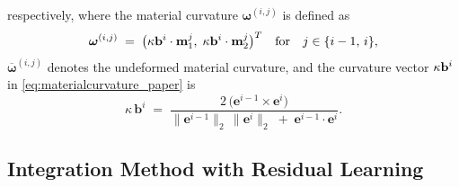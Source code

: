\begin{thm}
respectively, where the material curvature $\bm{\omega}^{(i,j)}$ is defined as
\begin{equation}
  \bm{\omega}^{(i,j)} \;=\; 
  \bigl(\kappa\mathbf{b}^i \cdot \mathbf{m}_1^j,\;\kappa\mathbf{b}^i \cdot \mathbf{m}_2^j\bigr)^T
  \quad \text{for} \quad j \in \{i-1,\,i\},
  \label{eq:materialcurvature_paper}
\end{equation}
\(\overline{\bm{\omega}}^{(i,j)}\) denotes the undeformed material curvature, 
and the curvature vector $\kappa\mathbf{b}^i$ in \eqref{eq:materialcurvature_paper} is
\begin{equation}
  \kappa \,\mathbf{b}^i 
  \;=\; 
  \frac{2\,\bigl(\mathbf{e}^{i-1} \times \mathbf{e}^i\bigr)}
  {\|\mathbf{e}^{i-1}\|_2\,\|\mathbf{e}^{i}\|_2 \;+\;\mathbf{e}^{i-1} \cdot \mathbf{e}^{i}}.
  \label{eq:curvature}
\end{equation}
\end{thm}

\subsection{Integration Method with Residual Learning}
\label{section:residual learning}


